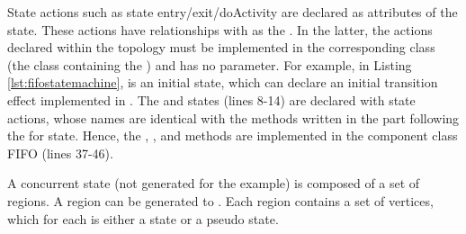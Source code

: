 State actions such as state entry/exit/doActivity are declared as attributes of the state.
These actions have relationships with  as the .
In the latter, the actions declared within the topology must be implemented in the corresponding class (the class containing the ) and has no parameter.
For example, in Listing \ref{lst:fifostatemachine},  is an initial state, which can declare an initial transition effect implemented in  . 
The  and  states (lines 8-14) are declared with state actions, whose names are identical with the methods written in the  part following the  for state. 
Hence, the , , and  methods are implemented in the component class FIFO (lines 37-46).

\begin{figure}
\begin{minipage}{0.95\columnwidth}
	
\end{minipage}
\end{figure}

A concurrent state (not generated for the example) is composed of a set of regions.
A region can be generated to  .
Each region contains a set of vertices, which for each is either a state or a pseudo state.


